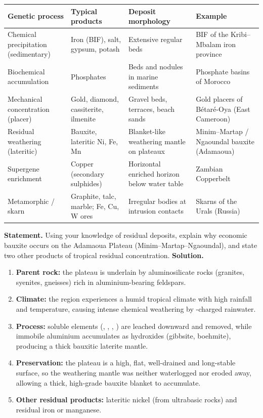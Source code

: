 \documentclass[11pt]{article}
\begin{document}
\begin{center}
\begin{tabularx}{\linewidth}{|l|X|X|X|}
\hline
\rowcolor{popblueL} \textbf{Genetic process} & \textbf{Typical products} & \textbf{Deposit morphology} & \textbf{Example} \\
\hline
Chemical precipitation (sedimentary) & Iron (BIF), salt, gypsum, potash & Extensive regular beds & BIF of the Kribi--Mbalam iron province \\
\hline
Biochemical accumulation & Phosphates & Beds and nodules in marine sediments & Phosphate basins of Morocco \\
\hline
Mechanical concentration (placer) & Gold, diamond, cassiterite, ilmenite & Gravel beds, terraces, beach sands & Gold placers of B\'etar\'e-Oya (East Cameroon) \\
\hline
Residual weathering (lateritic) & Bauxite, lateritic Ni, Fe, Mn & Blanket-like weathering mantle on plateaux & Minim--Martap / Ngaoundal bauxite (Adamaoua) \\
\hline
Supergene enrichment & Copper (secondary sulphides) & Horizontal enriched horizon below water table & Zambian Copperbelt \\
\hline
Metamorphic / skarn & Graphite, talc, marble; Fe, Cu, W ores & Irregular bodies at intrusion contacts & Skarns of the Urals (Russia) \\
\hline
\end{tabularx}
\end{center}

\begin{exoresolu}
\textbf{Statement.} Using your knowledge of residual deposits, explain why economic bauxite occurs on the Adamaoua Plateau (Minim--Martap--Ngaoundal), and state two other products of tropical residual concentration.
\tcblower
\textbf{Solution.}
\begin{enumerate}
\item \textbf{Parent rock:} the plateau is underlain by aluminosilicate rocks (granites, syenites, gneisses) rich in aluminium-bearing feldspars.
\item \textbf{Climate:} the region experiences a humid tropical climate with high rainfall and temperature, causing intense chemical weathering by -charged rainwater.
\item \textbf{Process:} soluble elements (, , , ) are leached downward and removed, while immobile aluminium accumulates as hydroxides (gibbsite, boehmite), producing a thick bauxitic laterite mantle.
\item \textbf{Preservation:} the plateau is a high, flat, well-drained and long-stable surface, so the weathering mantle was neither waterlogged nor eroded away, allowing a thick, high-grade bauxite blanket to accumulate.
\item \textbf{Other residual products:} lateritic nickel (from ultrabasic rocks) and residual iron or manganese.
\end{enumerate}
\end{exoresolu}
\end{document}
